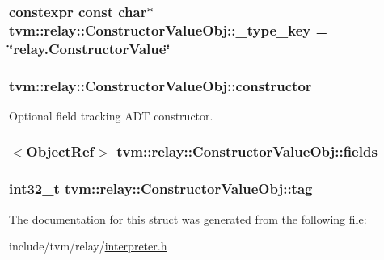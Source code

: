 \subsubsection[{\texorpdfstring{\+\_\+type\+\_\+key}{_type_key}}]{\setlength{\rightskip}{0pt plus 5cm}constexpr const char$\ast$ tvm\+::relay\+::\+Constructor\+Value\+Obj\+::\+\_\+type\+\_\+key = \char`\"{}relay.\+Constructor\+Value\char`\"{}\hspace{0.3cm}{\ttfamily [static]}}\hypertarget{structtvm_1_1relay_1_1ConstructorValueObj_a4854d6b1fc7047a03af41548b995df24}{}\label{structtvm_1_1relay_1_1ConstructorValueObj_a4854d6b1fc7047a03af41548b995df24}
\subsubsection[{\texorpdfstring{constructor}{constructor}}]{ tvm\+::relay\+::\+Constructor\+Value\+Obj\+::constructor}\hypertarget{structtvm_1_1relay_1_1ConstructorValueObj_a8a8374bec3445e7225ec5ee3fcdb5b6e}{}\label{structtvm_1_1relay_1_1ConstructorValueObj_a8a8374bec3445e7225ec5ee3fcdb5b6e}


Optional field tracking A\+DT constructor. 

\subsubsection[{\texorpdfstring{fields}{fields}}]{$<$Object\+Ref$>$ tvm\+::relay\+::\+Constructor\+Value\+Obj\+::fields}\hypertarget{structtvm_1_1relay_1_1ConstructorValueObj_a4ef262fa950a75da96814a5e539732a9}{}\label{structtvm_1_1relay_1_1ConstructorValueObj_a4ef262fa950a75da96814a5e539732a9}
\subsubsection[{\texorpdfstring{tag}{tag}}]{\setlength{\rightskip}{0pt plus 5cm}int32\+\_\+t tvm\+::relay\+::\+Constructor\+Value\+Obj\+::tag}\hypertarget{structtvm_1_1relay_1_1ConstructorValueObj_a4367c76ceee867b91ddd790931a1a362}{}\label{structtvm_1_1relay_1_1ConstructorValueObj_a4367c76ceee867b91ddd790931a1a362}


The documentation for this struct was generated from the following file\+:\begin{DoxyCompactItemize}
\item 
include/tvm/relay/\hyperlink{interpreter_8h}{interpreter.\+h}\end{DoxyCompactItemize}
